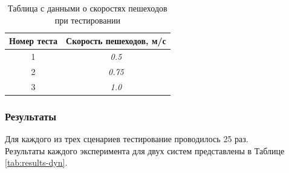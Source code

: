 \begin{table}[H]
\centering
\begin{tabular}{|c|c|}
\hline
\textbf{Номер теста} & \textbf{Скорость пешеходов, м/с} \\ \hline
1                    & \textit{0.5}                     \\ \hline
2                    & \textit{0.75}                    \\ \hline
3                    & \textit{1.0}                     \\ \hline
\end{tabular}
\caption{Таблица с данными о скоростях пешеходов при тестировании}
\label{tab:scen-dyn-1}
\end{table}

\subsubsection{Результаты}

Для каждого из трех сценариев тестирование проводилось 25 раз.\\
Результаты каждого эксперимента для двух систем представлены в Таблице \ref*{tab:results-dyn}.

